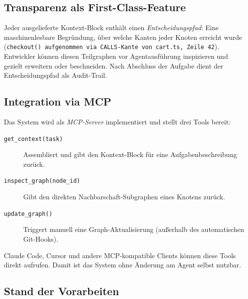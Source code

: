 

\subsection*{Transparenz als First-Class-Feature}

Jeder ausgelieferte Kontext-Block enthält einen \emph{Entscheidungspfad}: Eine maschinenlesbare Begründung, über welche Kanten jeder Knoten erreicht wurde (\texttt{checkout() aufgenommen via CALLS-Kante von cart.ts, Zeile 42}). Entwickler können diesen Teilgraphen vor Agentausführung inspizieren und gezielt erweitern oder beschneiden. Nach Abschluss der Aufgabe dient der Entscheidungspfad als Audit-Trail.

\subsection*{Integration via MCP}

Das System wird als \emph{MCP-Server} implementiert und stellt drei Tools bereit:

\begin{description}
  \item[\texttt{get\_context(task)}] Assembliert und gibt den Kontext-Block für eine Aufgabenbeschreibung zurück.
  \item[\texttt{inspect\_graph(node\_id)}] Gibt den direkten Nachbarschaft-Subgraphen eines Knotens zurück.
  \item[\texttt{update\_graph()}] Triggert manuell eine Graph-Aktualisierung (außerhalb des automatischen Git-Hooks).
\end{description}

Claude Code, Cursor und andere MCP-kompatible Clients können diese Tools direkt aufrufen. Damit ist das System ohne Änderung am Agent selbst nutzbar.

\subsection*{Stand der Vorarbeiten}

